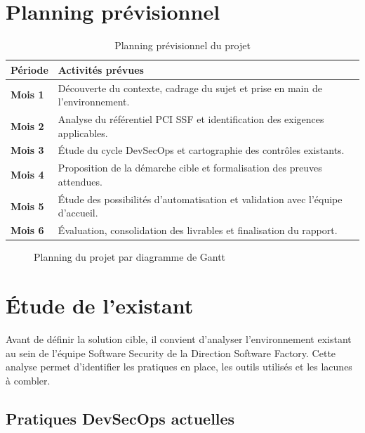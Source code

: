 \section{Planning prévisionnel}

\begin{table}[h!]
    \centering
    \caption{Planning prévisionnel du projet}
    \label{tab:planning-projet}
    \begin{tabularx}{\textwidth}{>{\bfseries}p{3cm}X}
        \toprule
        Période & Activités prévues \\
        \midrule
        Mois 1 & Découverte du contexte, cadrage du sujet et prise en main de l'environnement. \\
        Mois 2 & Analyse du référentiel PCI SSF et identification des exigences applicables. \\
        Mois 3 & Étude du cycle DevSecOps et cartographie des contrôles existants. \\
        Mois 4 & Proposition de la démarche cible et formalisation des preuves attendues. \\
        Mois 5 & Étude des possibilités d'automatisation et validation avec l'équipe d'accueil. \\
        Mois 6 & Évaluation, consolidation des livrables et finalisation du rapport. \\
        \bottomrule
    \end{tabularx}
\end{table}

\begin{figure}[h!]
    \centering
    \caption{Planning du projet par diagramme de Gantt}
    \label{fig:gantt-projet}
\end{figure}

\section{Étude de l'existant}

Avant de définir la solution cible, il convient d'analyser l'environnement existant au sein de l'équipe Software Security de la Direction Software Factory. Cette analyse permet d'identifier les pratiques en place, les outils utilisés et les lacunes à combler.

\subsection{Pratiques DevSecOps actuelles}

